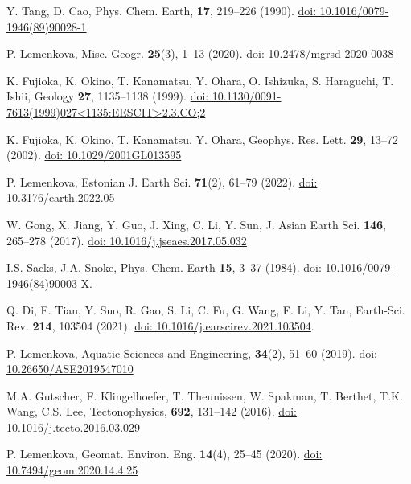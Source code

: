 \documentclass{rrparticle}
\begin{document}
\begin{thebibliography}{99}
 Y. Tang, D. Cao, Phys. Chem. Earth, \textbf{17}, 219--226 (1990). \href{https://doi.org/10.1016/0079-1946(89)90028-1}{doi: 10.1016/0079-1946(89)90028-1}.

 P. Lemenkova, Misc. Geogr. \textbf{25}(3), 1--13 (2020). \href{https://doi.org/10.2478/mgrsd-2020-0038}{doi: 10.2478/mgrsd-2020-0038}

 K. Fujioka, K. Okino, T. Kanamatsu, Y. Ohara, O. Ishizuka, S. Haraguchi, T. Ishii, Geology \textbf{27}, 1135--1138 (1999). \href{https://doi.org/10.1130/0091-7613(1999)027<1135:EESCIT>2.3.CO;2}{doi: 10.1130/0091-7613(1999)027<1135:EESCIT>2.3.CO;2}

 K. Fujioka, K. Okino, T. Kanamatsu, Y. Ohara, Geophys. Res. Lett. \textbf{29}, 13--72 (2002). \href{https://doi.org/10.1029/2001GL013595}{doi: 10.1029/2001GL013595}

 P. Lemenkova, Estonian J. Earth Sci. \textbf{71}(2), 61--79 (2022). \href{https://doi.org/10.3176/earth.2022.05}{doi: 10.3176/earth.2022.05}

 W. Gong, X. Jiang, Y. Guo, J. Xing, C. Li, Y. Sun, J. Asian Earth Sci. \textbf{146}, 265--278 (2017). \href{https://doi.org/10.1016/j.jseaes.2017.05.032}{doi: 10.1016/j.jseaes.2017.05.032}

 I.S. Sacks, J.A. Snoke, Phys. Chem. Earth \textbf{15}, 3--37 (1984). \href{https://doi.org/10.1016/0079-1946(84)90003-X}{doi: 10.1016/0079-1946(84)90003-X}.

 Q. Di, F. Tian, Y. Suo, R. Gao, S. Li, C. Fu, G. Wang, F. Li, Y. Tan, Earth-Sci. Rev. \textbf{214}, 103504 (2021). \href{https://doi.org/10.1016/j.earscirev.2021.103504}{doi: 10.1016/j.earscirev.2021.103504}.

 P. Lemenkova, Aquatic Sciences and Engineering, \textbf{34}(2), 51--60 (2019). \href{https://doi.org/10.26650/ASE2019547010}{doi: 10.26650/ASE2019547010}
	
 M.A. Gutscher, F. Klingelhoefer, T. Theunissen, W. Spakman, T. Berthet, T.K. Wang, C.S. Lee, Tectonophysics, \textbf{692}, 131--142 (2016). \href{https://doi.org/10.1016/j.tecto.2016.03.029}{doi: 10.1016/j.tecto.2016.03.029}

 P. Lemenkova, Geomat. Environ. Eng. \textbf{14}(4), 25--45 (2020). \href{https://doi.org/10.7494/geom.2020.14.4.25}{doi: 10.7494/geom.2020.14.4.25}


\end{thebibliography}
\end{document}
